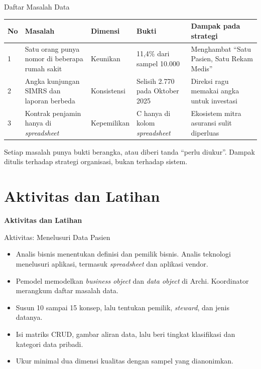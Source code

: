 \documentclass[aspectratio=169, table, 12pt]{beamer}
\begin{document}
\begin{frame}{{\Large Daftar Masalah Data}}
  \scriptsize
  \begin{tabularx}{\textwidth}{lXlXX}
    \hline
    \textbf{No} & \textbf{Masalah} & \textbf{Dimensi} & \textbf{Bukti} & \textbf{Dampak pada strategi} \\
    \hline
    1 & Satu orang punya nomor di beberapa rumah sakit & Keunikan & 11,4\% dari
      sampel 10.000 & Menghambat ``Satu Pasien, Satu Rekam Medis'' \\
    \hline
    2 & Angka kunjungan SIMRS dan laporan berbeda & Konsistensi & Selisih 2.770
      pada Oktober 2025 & Direksi ragu memakai angka untuk investasi \\
    \hline
    3 & Kontrak penjamin hanya di \textit{spreadsheet} & Kepemilikan & C hanya
      di kolom \textit{spreadsheet} & Ekosistem mitra asuransi sulit
      diperluas \\
    \hline
  \end{tabularx}

  \vspace{8pt}
  \small Setiap masalah punya bukti berangka, atau diberi tanda ``perlu diukur''. Dampak ditulis terhadap
  strategi organisasi, bukan terhadap sistem.
\end{frame}

\section{Aktivitas dan Latihan}

\begin{frame}{\hfill}
  \centering
  \Huge{\textbf{Aktivitas dan Latihan}}
\end{frame}

\begin{frame}{{\Large Aktivitas: Menelusuri Data Pasien}}
  \vspace{6pt}
  \small
  \begin{itemize}
    \item Analis bisnis menentukan definisi dan pemilik bisnis. Analis teknologi menelusuri aplikasi,
          termasuk \textit{spreadsheet} dan aplikasi vendor.
    \item Pemodel memodelkan \textit{business object} dan \textit{data object} di Archi. Koordinator
          merangkum daftar masalah data.
    \item Susun 10 sampai 15 konsep, lalu tentukan pemilik, \textit{steward}, dan jenis datanya.
    \item Isi matriks CRUD, gambar aliran data, lalu beri tingkat klasifikasi dan kategori data pribadi.
    \item Ukur minimal dua dimensi kualitas dengan sampel yang dianonimkan.
  \end{itemize}
\end{frame}
\end{document}
